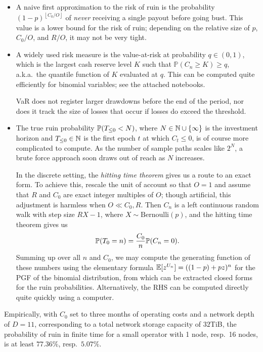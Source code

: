 \begin{itemize}
  \item A naive first approximation to the risk of ruin is the probability $(1-p)^{\left\lfloor C_0/O \right\rfloor}$ of \emph{never} receiving a single payout before going bust.
  This value is a lower bound for the risk of ruin; depending on the relative size of $p$, $C_0/O$, and $R/O$, it may not be very tight.

  \item A widely used risk measure is the value-at-risk at probability $q\in(0,1)$, which is the largest cash reserve level $K$ such that $\mathbb{P}(C_n\geq K)\geq q$, a.k.a.~the quantile function of $K$ evaluated at $q$.
  This can be computed quite efficiently for binomial variables; see the attached notebooks.
  
  VaR does not register larger drawdowns before the end of the period, nor does it track the size of losses that occur if losses do exceed the threshold.
  
  \item 
    The true ruin probability $\mathbb{P}(T_{\leq 0}<N)$, where $N\in\mathbb{N}\cup\{\infty\}$ is the investment horizon and $T_{\leq 0}\in\mathbb{N}$ is the first epoch $t$ at which $C_t\leq 0$, is of course more complicated to compute.
    As the number of sample paths scales like $2^N$, a brute force approach soon draws out of reach as $N$ increases.

    In the discrete setting, the \emph{hitting time theorem} gives us a route to an exact form.
    To achieve this, rescale the unit of account so that $O=1$ and assume that $R$ and $C_0$ are exact integer multiples of $O$; though artificial, this adjustment is harmless when $O\ll C_0,R$.
    Then $C_n$ is a left continuous random walk with step size $RX - 1$, where $X\sim\mathrm{Bernoulli}(p)$, and the hitting time theorem gives us
    \[
      \mathbb{P}(T_0 = n) = \frac{C_0}{n}\mathbb{P}(C_n = 0).
    \]
    Summing up over all $n$ and $C_0$, we may compute the generating function of these numbers using the elementary formula $\mathbb{E}[z^{U_n}] = ((1-p) + pz)^n$ for the PGF of the binomial distribution, from which can be extracted closed forms for the ruin probabilities.
    Alternatively, the RHS can be computed directly quite quickly using a computer.    

\end{itemize}


Empirically, with $C_0$ set to three months of operating costs and a network depth of $D=11$, corresponding to a total network storage capacity of $32$TiB, the probability of ruin in finite time for a small operator with 1 node, resp.~16 nodes, is at least $77.36\%$, resp.~$5.07\%$.
    
